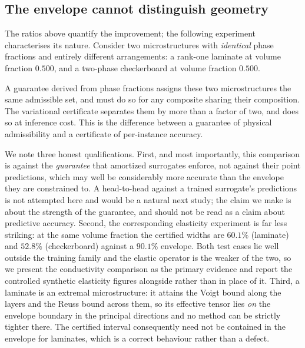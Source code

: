 \subsection{The envelope cannot distinguish geometry}
\label{sec:tightness:geometry}

The ratios above quantify the improvement; the following experiment
characterises its nature. Consider two microstructures with \emph{identical}
phase fractions and entirely different arrangements: a rank-one laminate at
volume fraction $0.500$, and a two-phase checkerboard at volume fraction
$0.500$.

\begin{table}[t]
\centering
\caption{Identical volume fraction, different geometry, conductivity at
contrast $10$. The Voigt--Reuss envelope is a function of phase fraction
alone and is therefore identical for both; the certified intervals differ
by more than a factor of two.}
\label{tab:geometry}
\end{table}

A guarantee derived from phase fractions assigns these two microstructures
the same admissible set, and must do so for any composite sharing their
composition. The variational certificate separates them by more than a
factor of two, and does so at inference cost. This is the difference
between a guarantee of physical admissibility and a certificate of
per-instance accuracy.

We note three honest qualifications. First, and most importantly, this
comparison is against the \emph{guarantee} that amortized surrogates
enforce, not against their point predictions, which may well be
considerably more accurate than the envelope they are constrained to. A
head-to-head against a trained surrogate's predictions is not attempted
here and would be a natural next study; the claim we make is about the
strength of the guarantee, and should not be read as a claim about
predictive accuracy. Second, the corresponding elasticity
experiment is far less striking: at the same volume fraction the certified
widths are $60.1\%$ (laminate) and $52.8\%$ (checkerboard) against a
$90.1\%$ envelope. Both test cases lie well outside the training family and
the elastic operator is the weaker of the two, so we present the
conductivity comparison as the primary evidence and report the controlled
synthetic elasticity figures alongside rather than in place of it. Third, a laminate is an
extremal microstructure: it attains the Voigt bound along the layers and
the Reuss bound across them, so its effective tensor lies \emph{on} the
envelope boundary in the principal directions and no method can be strictly
tighter there. The certified interval consequently need not be contained in
the envelope for laminates, which is a correct behaviour rather than a
defect.

